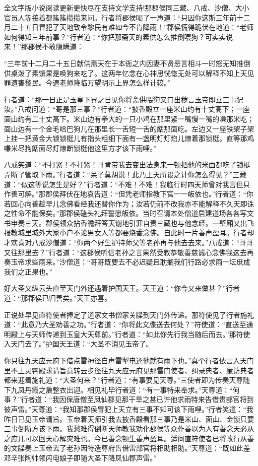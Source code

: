 \documentclass[12pt,UTF8]{ctexbook}
\begin{document}
{	全文字版小说阅读更新更快尽在支持文学支持!那郡侯同三藏、八戒、沙僧、大小官员人等接着都簇簇攒攒来问。行者将郡侯喝了一声道：“只因你这斯三年前十二月二十五日冒犯了天地致令黎民有难如今不肯降雨！”郡侯慌得跪伏在地道：“老师如何得知三年前事？”行者道：“你把那斋天的素供怎么推倒喂狗？可实实说来！”那郡侯不敢隐瞒道：
	
	“三年前十二月二十五日献供斋天在于本衙之内因妻不贤恶言相斗一时怒无知推倒供桌泼了素馔果是唤狗来吃了。这两年忆念在心神思恍惚无处可以解释不知上天见罪遗害黎民。今遇老师降临万望明示上界怎么样计较。”
	
	行者道：“那一日正是玉皇下界之日见你将斋供喂狗又口出秽言玉帝即立三事记汝。”八戒问道：“哥是那三事？”行者道：“披香殿立一座米山约有十丈高下；一座面山约有二十丈高下。米山边有拳大的一只小鸡在那里紧一嘴慢一嘴的嗛那米吃；面山边有一个金毛哈巴狗儿在那里长一舌短一舌的餂那面吃。左边又一座铁架子架上挂一把黄金大锁锁梃儿有指头粗细下面有一盏明灯灯焰儿燎着那锁梃。直等那鸡嗛米尽狗餂面尽灯燎断锁梃他这里方才该下雨哩。”
	
	八戒笑道：“不打紧！不打紧！哥肯带我去变出法身来一顿把他的米面都吃了锁梃弄断了管取下雨。”行者道：“呆子莫胡说！此乃上天所设之计你怎么得见？”三藏道：“似这等说怎生是好？”行者道：“不难！不难！我临行时四天师曾对我言但只作善可解。”那郡侯拜伏在地哀告道：“但凭老师指教下官一一皈依也。”行者道：“你若回心向善趁早儿念佛看经我还替你作为；汝若仍前不改我亦不能解释不久天即诛之性命不能保矣。”那郡侯磕头礼拜誓愿皈依。当时召请本处僧道启建道场各各写文书申奏三天。郡侯领众拈香瞻拜答天谢地引罪自责三藏也与他念经。一壁厢又出飞报教城里城外大家小户不论男女人等都要烧香念佛。自此时一片善声盈耳。行者却才欢喜对八戒沙僧道：“你两个好生护持师父等老孙再与他去去来。”八戒道：“哥哥又往那里去？”行者道：“这郡侯听信老孙之言果然受教恭敬善慈诚心念佛我这去再奏玉帝求些雨来。”沙僧道：“哥哥既要去不必迟疑且耽搁我们行路必求雨一坛庶成我们之正果也。”
	
	好大圣又纵云头直至天门外还遇着护国天王。天王道：“你今又来做甚？”行者道：“那郡侯已归善矣。”天王亦喜。
	
	正说处早见直符使者捧定了道家文书僧家关牒到天门外传递。那符使见了行者施礼道：“此意乃大圣劝善之功。”行者道：“你将此文牒送去何处？”符使道：“直送至通明殿上与天师传递到玉皇大天尊前。”行者道：“如此你先行我当随后而去。”那符使入天门去了。”护国天王道：“大圣不消见玉帝了。
	
	你只往九天应元府下借点雷神径自声雷掣电还他就有雨下也。”真个行者依言入天门里不上灵霄殿求请旨意转云步径往九天应元府见那雷门使者、纠录典者、廉访典者都来迎着施礼道：“大圣何来？”行者道：“有事要见天尊。”三使者即为传奏天尊随下九凤丹霞之扆整衣出迎。相见礼毕行者道：“有一事特来奉求。”天尊道：“何事？”行者道：“我因保唐僧至凤仙郡见那干旱之甚已许他求雨特来告借贵部官将到彼声雷。”天尊道：“我知那郡侯冒犯上天立有三事不知可该下雨哩。”行者笑道：“我昨日已见玉帝请旨。玉帝着天师引我去披香殿看那三事乃是米山、面山、金锁只要三事倒断方该下雨。我愁难得倒断天师教我劝化郡侯等众作善以为人有善念天必从之庶几可以回天心解灾难也。今已善念顿生善声盈耳。适间直符使者已将改行从善的文牒奏上玉帝去了老孙因特造尊府告借雷部官将相助相助。”天尊道：“既如此差邓辛张陶帅领闪电娘子即随大圣下降凤仙郡声雷。”
	
}
\end{document}
